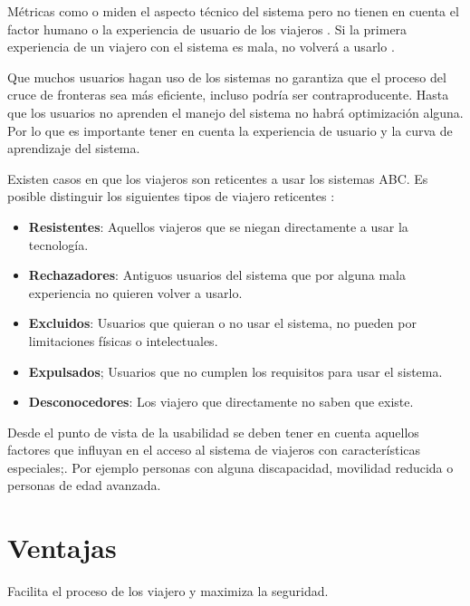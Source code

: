 Métricas como  o  miden el aspecto técnico del sistema pero no tienen en cuenta el factor humano o la experiencia de usuario de los viajeros \cite{el2010study}. Si la primera experiencia de un viajero con el sistema es mala, no volverá a usarlo \cite{macleod2011methodology} \cite{graves2011role}.

Que muchos usuarios hagan uso de los sistemas  no garantiza que el proceso del cruce de fronteras sea más eficiente, incluso podría ser contraproducente. Hasta que los usuarios no aprenden el manejo del sistema no habrá optimización alguna. Por lo que es importante tener en cuenta la experiencia de usuario y la curva de aprendizaje del sistema.   

Existen casos en que los viajeros son reticentes a usar los sistemas ABC. Es posible distinguir los siguientes tipos de viajero reticentes \cite{oostveen2014non}:

\begin{itemize}
    \item 
    \textbf{Resistentes}: Aquellos viajeros que se niegan directamente a usar la tecnología.
    \item
    \textbf{Rechazadores}: Antiguos usuarios del sistema que por alguna mala experiencia no quieren volver a usarlo.
    \item
    \textbf{Excluidos}: Usuarios que quieran o no usar el sistema, no pueden por limitaciones físicas o intelectuales.
    \item
    \textbf{Expulsados}; Usuarios que no cumplen los requisitos para usar el sistema.
    \item
    \textbf{Desconocedores}: Los viajero que directamente no saben que existe.
\end{itemize}

Desde el punto de vista de la \gls{usabilidad} se deben tener en cuenta aquellos factores que influyan en el acceso al sistema de viajeros con características especiales;. Por ejemplo personas con alguna discapacidad, movilidad reducida o personas de edad avanzada\cite{sasse2013usable}.



\section{Ventajas}\label{sec:VentajasABC}

Facilita el proceso de los viajero y maximiza la seguridad.

